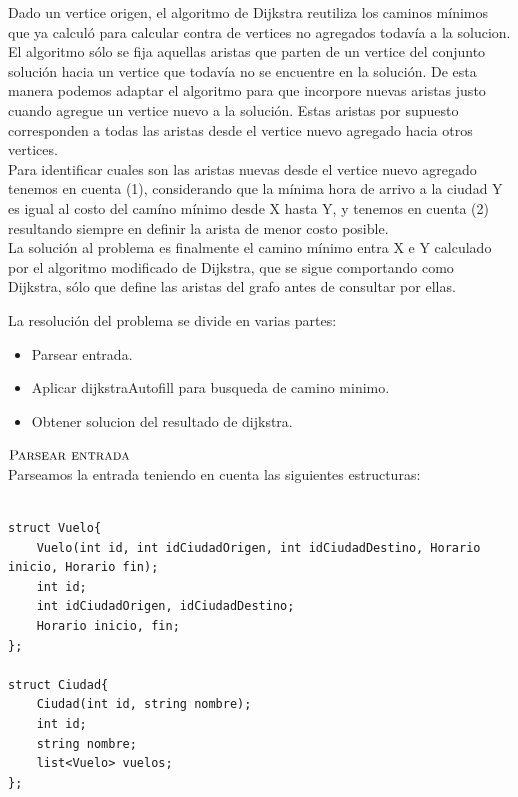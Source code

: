\noindent
Dado un vertice origen, el algoritmo de Dijkstra reutiliza los caminos m\'inimos que ya calcul\'o para calcular contra de vertices no agregados todav\'ia a la solucion. El algoritmo s\'olo se fija aquellas aristas que parten de un vertice del conjunto soluci\'on hacia un vertice que todav\'ia no se encuentre en la soluci\'on. De esta manera podemos adaptar el algoritmo para que incorpore nuevas aristas justo cuando agregue un vertice nuevo a la soluci\'on. Estas aristas por supuesto corresponden a todas las aristas desde el vertice nuevo agregado hacia otros vertices. \\
Para identificar cuales son las aristas nuevas desde el vertice nuevo agregado tenemos en cuenta (1), considerando que la m\'inima hora de arrivo a la ciudad Y es igual al costo del cam\'ino m\'inimo desde X hasta Y, y tenemos en cuenta (2) resultando siempre en definir la arista de menor costo posible.\\

\noindent
La soluci\'on al problema es finalmente el camino m\'inimo entra X e Y calculado por el algoritmo modificado de Dijkstra, que se sigue comportando como Dijkstra, s\'olo que define las aristas del grafo antes de consultar por ellas. \\
\bigskip
\bigskip

\noindent
La resoluci\'on del problema se divide en varias partes:

\begin{itemize}
\item Parsear entrada.
\item Aplicar dijkstraAutofill para busqueda de camino minimo.
\item Obtener solucion del resultado de dijkstra.
\end{itemize}

\noindent
$\textnormal{\scshape Parsear entrada}$ \\

Parseamos la entrada teniendo en cuenta las siguientes estructuras:

\begin{lstlisting}

struct Vuelo{
	Vuelo(int id, int idCiudadOrigen, int idCiudadDestino, Horario inicio, Horario fin);
	int id;
	int idCiudadOrigen, idCiudadDestino;
	Horario inicio, fin;
};

struct Ciudad{
	Ciudad(int id, string nombre);
	int id;
	string nombre;
	list<Vuelo> vuelos;
};

\end{lstlisting}
\bigskip

